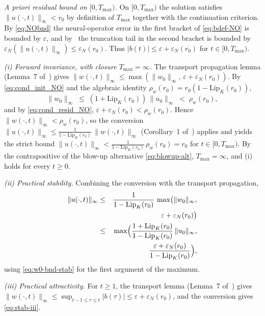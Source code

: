 \documentclass[twocolumn,amsthm]{autart}
\newcommand{\Lipk}{\mathrm{Lip}_K}
\newcommand{\eps}{\varepsilon}
\theoremstyle{plain}
\theoremstyle{definition}
\begin{document}
\emph{A priori residual bound on $[0, T_{\max})$.} On $[0, T_{\max})$ the solution satisfies $\|u(\cdot,t)\|_\infty < r_0$ by definition of $T_{\max}$ together with the continuation criterion. By \eqref{eq:NObnd} the neural-operator error in the first bracket of \eqref{eq:bdef-NO} is bounded by $\eps$, and by~\cite{krstic2026feedbacklinearizationhyperbolicpdes-trunc} the truncation tail in the second bracket is bounded by $\eps_N(\|u(\cdot,t)\|_\infty) \le \eps_N(r_0)$. Thus $|b(t)| \le \eps + \eps_N(r_0)$ for $t \in [0, T_{\max})$.

\emph{(i) Forward invariance, with closure $T_{\max} = \infty$.} The transport propagation lemma (Lemma~7 of~\cite{krstic2026feedbacklinearizationhyperbolicpdes-trunc}) gives $\|w(\cdot,t)\|_\infty \le \max(\|w_0\|_\infty,\, \eps + \eps_N(r_0))$. By \eqref{eq:cond_init_NO} and the algebraic identity $\rho_w(r_0) = r_0(1 - \Lipk(r_0))$,
\begin{equation}
\|w_0\|_\infty \;\le\; (1 + \Lipk(r_0))\,\|u_0\|_\infty \;<\; \rho_w(r_0),
\label{eq:w0-bnd-stab}
\end{equation}
and by \eqref{eq:cond_resid_NO}, $\eps + \eps_N(r_0) < \rho_w(r_0)$. Hence $\|w(\cdot,t)\|_\infty < \rho_w(r_0)$, so the conversion $\|u(\cdot,t)\|_\infty \le \frac{1}{1-\Lipk(r_0)}\,\|w(\cdot,t)\|_\infty$ (Corollary~1 of~\cite{krstic2026feedbacklinearizationhyperbolicpdes-trunc}) applies and yields the strict bound $\|u(\cdot,t)\|_\infty < \frac{1}{1-\Lipk(r_0)}\,\rho_w(r_0) = r_0$ for $t \in [0, T_{\max})$. By the contrapositive of the blow-up alternative \eqref{eq:blowup-alt}, $T_{\max} = \infty$, and (i) holds for every $t \ge 0$.

\emph{(ii) Practical stability.} Combining the conversion with the transport propagation,
\begin{eqnarray}
\|u(\cdot,t)\|_\infty
&\le& \frac{1}{1-\Lipk(r_0)}\,\max\bigl(\|w_0\|_\infty, \nonumber \\
&& \qquad\qquad\qquad\ \, \eps + \eps_N(r_0)\bigr) \nonumber \\
&\le& \max\Bigl(\frac{1+\Lipk(r_0)}{1-\Lipk(r_0)}\,\|u_0\|_\infty, \nonumber \\
&& \qquad\ \frac{\eps + \eps_N(r_0)}{1-\Lipk(r_0)}\Bigr),
\label{eq:ii-bnd}
\end{eqnarray}
using \eqref{eq:w0-bnd-stab} for the first argument of the maximum.

\emph{(iii) Practical attractivity.} For $t \ge 1$, the transport lemma (Lemma~7 of~\cite{krstic2026feedbacklinearizationhyperbolicpdes-trunc}) gives $\|w(\cdot,t)\|_\infty \le \sup_{t-1\le\tau\le t}|b(\tau)| \le \eps + \eps_N(r_0)$, and the conversion gives \eqref{eq:stab-iii}.
\end{document}
